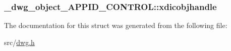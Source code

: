 \hypertarget{struct__dwg__object__APPID__CONTROL_a69bcc1630fe6179e4c312b2b100ad579}{
\subsubsection[{xdicobjhandle}]{ {\bf \-\_\-dwg\-\_\-object\-\_\-\-A\-P\-P\-I\-D\-\_\-\-C\-O\-N\-T\-R\-O\-L\-::xdicobjhandle}}}\label{struct__dwg__object__APPID__CONTROL_a69bcc1630fe6179e4c312b2b100ad579}


\-The documentation for this struct was generated from the following file\-:\begin{DoxyCompactItemize}
\item 
src/\hyperlink{dwg_8h}{dwg.\-h}\end{DoxyCompactItemize}
